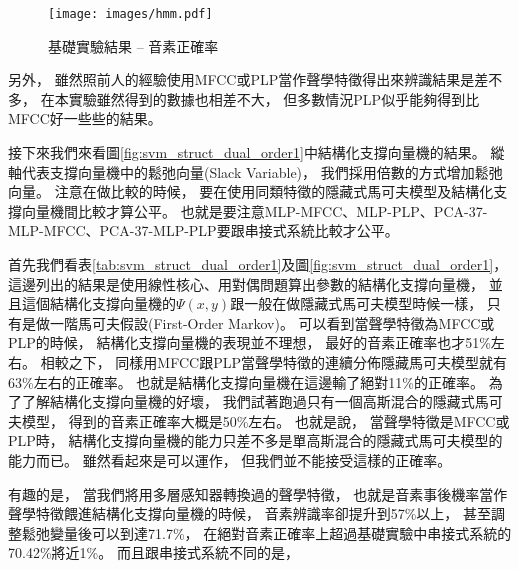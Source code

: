     \begin{figure}
      \begin{center}
	\texttt{[image: images/hmm.pdf]}
      \end{center}
      \caption{基礎實驗結果 -- 音素正確率}
      \label{fig:baseline}
    \end{figure}
  
    \newpage

    另外，
    雖然照前人的經驗使用MFCC或PLP當作聲學特徵得出來辨識結果是差不多，
    在本實驗雖然得到的數據也相差不大，
    但多數情況PLP似乎能夠得到比MFCC好一些些的結果。
    
    接下來我們來看圖\ref{fig:svm_struct_dual_order1}中結構化支撐向量機的結果。
    縱軸代表支撐向量機中的鬆弛向量(Slack Variable)，
    我們採用倍數的方式增加鬆弛向量。
    注意在做比較的時候，
    要在使用同類特徵的隱藏式馬可夫模型及結構化支撐向量機間比較才算公平。
    也就是要注意MLP-MFCC、MLP-PLP、PCA-37-MLP-MFCC、PCA-37-MLP-PLP要跟串接式系統比較才公平。
    
    首先我們看表\ref{tab:svm_struct_dual_order1}及圖\ref{fig:svm_struct_dual_order1}，
    這邊列出的結果是使用線性核心、用對偶問題算出參數的結構化支撐向量機，
    並且這個結構化支撐向量機的$\Psi(x, y)$跟一般在做隱藏式馬可夫模型時候一樣，
    只有是做一階馬可夫假設(First-Order Markov)。
    可以看到當聲學特徵為MFCC或PLP的時候，
    結構化支撐向量機的表現並不理想，
    最好的音素正確率也才51\%左右。
    相較之下，
    同樣用MFCC跟PLP當聲學特徵的連續分佈隱藏馬可夫模型就有63\%左右的正確率。
    也就是結構化支撐向量機在這邊輸了絕對11\%的正確率。
    為了了解結構化支撐向量機的好壞，
    我們試著跑過只有一個高斯混合的隱藏式馬可夫模型，
    得到的音素正確率大概是50\%左右。
    也就是說，
    當聲學特徵是MFCC或PLP時，
    結構化支撐向量機的能力只差不多是單高斯混合的隱藏式馬可夫模型的能力而已。
    雖然看起來是可以運作，
    但我們並不能接受這樣的正確率。

    有趣的是，
    當我們將用多層感知器轉換過的聲學特徵，
    也就是音素事後機率當作聲學特徵餵進結構化支撐向量機的時候，
    音素辨識率卻提升到57\%以上，
    甚至調整鬆弛變量後可以到達71.7\%，
    在絕對音素正確率上超過基礎實驗中串接式系統的70.42\%將近1\%。
    而且跟串接式系統不同的是，
    
    \newpage

